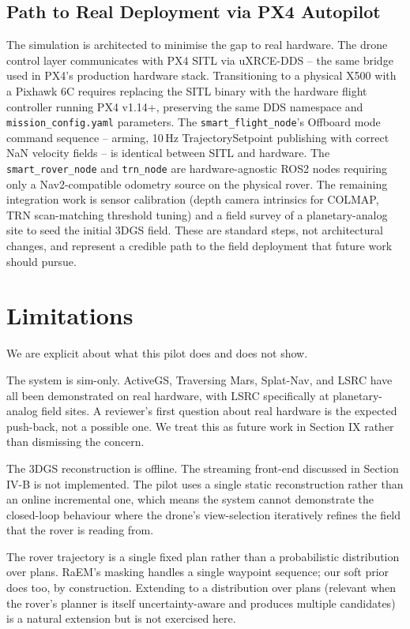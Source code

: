 \documentclass[conference]{IEEEtran}
\begin{document}
\subsection{Path to Real Deployment via PX4 Autopilot}
The simulation is architected to minimise the gap to real hardware. The drone control layer communicates with PX4 SITL via uXRCE-DDS -- the same bridge used in PX4's production hardware stack. Transitioning to a physical X500 with a Pixhawk 6C requires replacing the SITL binary with the hardware flight controller running PX4 v1.14+, preserving the same DDS namespace and \texttt{mission\_config.yaml} parameters. The \texttt{smart\_flight\_node}'s Offboard mode command sequence -- arming, 10\,Hz TrajectorySetpoint publishing with correct NaN velocity fields -- is identical between SITL and hardware. The \texttt{smart\_rover\_node} and \texttt{trn\_node} are hardware-agnostic ROS2 nodes requiring only a Nav2-compatible odometry source on the physical rover. The remaining integration work is sensor calibration (depth camera intrinsics for COLMAP, TRN scan-matching threshold tuning) and a field survey of a planetary-analog site to seed the initial 3DGS field. These are standard steps, not architectural changes, and represent a credible path to the field deployment that future work should pursue.


\section{Limitations}
We are explicit about what this pilot does and does not show.

The system is sim-only. ActiveGS, Traversing Mars, Splat-Nav, and LSRC have all been demonstrated on real hardware, with LSRC specifically at planetary-analog field sites. A reviewer's first question about real hardware is the expected push-back, not a possible one. We treat this as future work in Section IX rather than dismissing the concern.

The 3DGS reconstruction is offline. The streaming front-end discussed in Section IV-B is not implemented. The pilot uses a single static reconstruction rather than an online incremental one, which means the system cannot demonstrate the closed-loop behaviour where the drone's view-selection iteratively refines the field that the rover is reading from.

The rover trajectory is a single fixed plan rather than a probabilistic distribution over plans. RaEM's masking handles a single waypoint sequence; our soft prior does too, by construction. Extending to a distribution over plans (relevant when the rover's planner is itself uncertainty-aware and produces multiple candidates) is a natural extension but is not exercised here.
\end{document}
